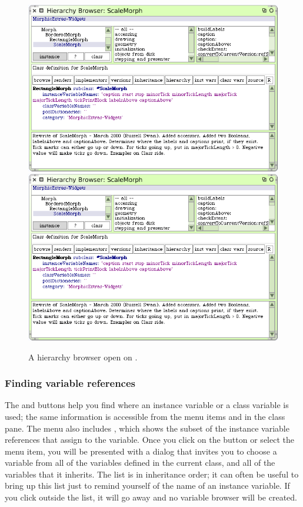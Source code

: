 \documentclass[a4paper,10pt,twoside]{book}
\begin{document}
\begin{figure}[btp]
	\begin{center}
	\ifluluelse
		{\includegraphics[width=\textwidth]{hierarchyBrowser}}
		{\includegraphics[scale=0.7]{hierarchyBrowser}}
	\end{center}
	\caption{A hierarchy browser open on .}
	\label{fig:hierarchyBrowser}
\end{figure}

\subsubsection{Finding variable references}
\label{sec:variables}

The  and  buttons help you find where an instance variable or a class variable is used; the same information is accessible from the  menu items  and  in the class pane.  
The menu also includes , which shows the subset of the instance variable references that assign to the variable. 
Once you click on the button or select the menu item, you will be presented with a dialog that invites you to choose a variable from all of the variables defined in the current class, and all of the variables that it inherits.  The list is in inheritance order; it can often be useful to bring up this list just to remind yourself of the name of an instance variable.  If you click outside the list, it will go away and no variable browser will be created.
\end{document}
